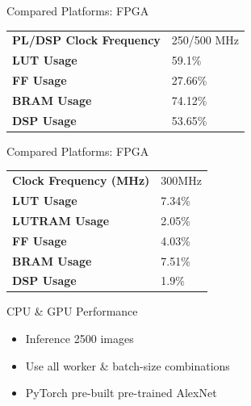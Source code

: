 \begin{frame}{Compared Platforms: FPGA}
	\begin{table}[H]
		\centering
		\begin{tabular}{ll}
			\toprule
			\textbf{PL/DSP Clock Frequency} & 250/500 MHz \\
			\textbf{LUT Usage}              & 59.1\%      \\
			\textbf{FF Usage}               & 27.66\%     \\
			\textbf{BRAM Usage}             & 74.12\%     \\
			\textbf{DSP Usage}              & 53.65\%     \\
			\bottomrule
		\end{tabular}
	\end{table}
\end{frame}

\begin{frame}{Compared Platforms: FPGA}
	\begin{table}[H]
		\centering
		\begin{tabular}{ll}
			\toprule
			\textbf{Clock Frequency (MHz)} & 300MHz \\
			\textbf{LUT Usage}             & 7.34\% \\
			\textbf{LUTRAM Usage}          & 2.05\% \\
			\textbf{FF Usage}              & 4.03\% \\
			\textbf{BRAM Usage}            & 7.51\% \\
			\textbf{DSP Usage}             & 1.9\%  \\
			\bottomrule
		\end{tabular}
	\end{table}
\end{frame}

\begin{frame}{CPU \& GPU Performance}
	\begin{itemize}
		\item Inference 2500 images
		\item Use all worker \& batch-size combinations
		\item PyTorch pre-built pre-trained AlexNet
	\end{itemize}
\end{frame}

